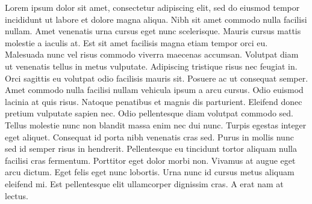 Lorem ipsum dolor sit amet, consectetur adipiscing elit, sed do eiusmod tempor incididunt ut labore et dolore magna aliqua. 
Nibh sit amet commodo nulla facilisi nullam.
Amet venenatis urna cursus eget nunc scelerisque. 
Mauris cursus mattis molestie a iaculis at. 
Est sit amet facilisis magna etiam tempor orci eu. 
Malesuada nunc vel risus commodo viverra maecenas accumsan. 
Volutpat diam ut venenatis tellus in metus vulputate. 
Adipiscing tristique risus nec feugiat in. 
Orci sagittis eu volutpat odio facilisis mauris sit. 
Posuere ac ut consequat semper. 
Amet commodo nulla facilisi nullam vehicula ipsum a arcu cursus.
Odio euismod lacinia at quis risus. 
Natoque penatibus et magnis dis parturient.
Eleifend donec pretium vulputate sapien nec.
Odio pellentesque diam volutpat commodo sed.
Tellus molestie nunc non blandit massa enim nec dui nunc. 
Turpis egestas integer eget aliquet.
Consequat id porta nibh venenatis cras sed.
Purus in mollis nunc sed id semper risus in hendrerit. 
Pellentesque eu tincidunt tortor aliquam nulla facilisi cras fermentum. 
Porttitor eget dolor morbi non. 
Vivamus at augue eget arcu dictum. 
Eget felis eget nunc lobortis. 
Urna nunc id cursus metus aliquam eleifend mi.
Est pellentesque elit ullamcorper dignissim cras. 
A erat nam at lectus.